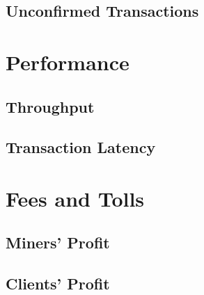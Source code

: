 \documentclass[USenglish]{uit-thesis}
\begin{document}

\subsection{Unconfirmed Transactions}
\label{sec:unconfirmedtxs}

\section{Performance}
\label{sec:performance}

\subsection{Throughput}
\label{sec:throughput}

\subsection{Transaction Latency}
\label{sec:txslatency}

\section{Fees and Tolls}
\label{sec:feesandtolls}

\subsection{Miners' Profit}
\label{sec:minersprofit}

\subsection{Clients' Profit}
\label{sec:clientprofit}
\end{document}
